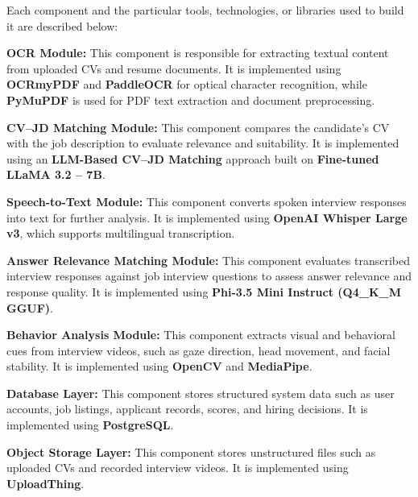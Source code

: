 \newpage
Each component and the particular tools, technologies, or libraries used to build it are described below:
\begin{outline}
    \1 \textbf{OCR Module:} This component is responsible for extracting textual content from uploaded CVs and resume documents. It is implemented using \textbf{OCRmyPDF} and \textbf{PaddleOCR} for optical character recognition, while \textbf{PyMuPDF} is used for PDF text extraction and document preprocessing.

    \1 \textbf{CV--JD Matching Module:} This component compares the candidate's CV with the job description to evaluate relevance and suitability. It is implemented using an \textbf{LLM-Based CV--JD Matching} approach built on \textbf{Fine-tuned LLaMA 3.2 -- 7B}.

    \1 \textbf{Speech-to-Text Module:} This component converts spoken interview responses into text for further analysis. It is implemented using \textbf{OpenAI Whisper Large v3}, which supports multilingual transcription.
    
    \1 \textbf{Answer Relevance Matching Module:} This component evaluates transcribed interview responses against job interview questions to assess answer relevance and response quality. It is implemented using \textbf{Phi-3.5 Mini Instruct (Q4\_K\_M GGUF)}.

    \1 \textbf{Behavior Analysis Module:} This component extracts visual and behavioral cues from interview videos, such as gaze direction, head movement, and facial stability. It is implemented using \textbf{OpenCV} and \textbf{MediaPipe}.

    \1 \textbf{Database Layer:} This component stores structured system data such as user accounts, job listings, applicant records, scores, and hiring decisions. It is implemented using \textbf{PostgreSQL}.

    \1 \textbf{Object Storage Layer:} This component stores unstructured files such as uploaded CVs and recorded interview videos. It is implemented using \textbf{UploadThing}.
\end{outline}